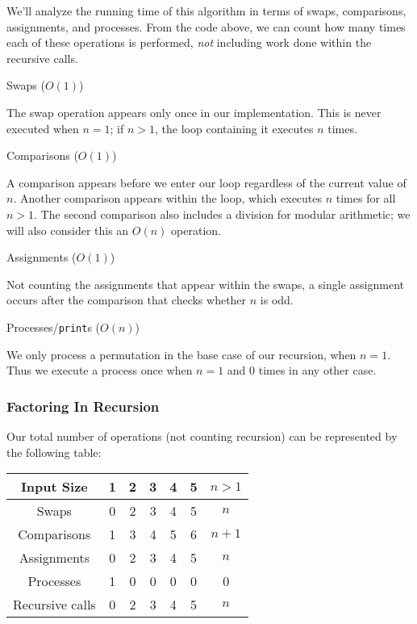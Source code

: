 \documentclass[10pt, oneside]{article}   	%
\begin{document}
We'll analyze the running time of this algorithm in terms of swaps, comparisons, assignments, and processes. From the code above, we can count how many times each of these operations is performed, \emph{not} including work done within the recursive calls.
\begin{description}
\item Swaps ($O(1)$)

	The swap operation appears only once in our implementation. This is never executed when $n=1$; if $n > 1$, the loop containing it executes $n$ times.

\item Comparisons ($O(1)$)

	A comparison appears before we enter our loop regardless of the current value of $n$. Another comparison appears within the loop, which executes $n$ times for all $n > 1$. The second comparison also includes a division for modular arithmetic; we will also consider this an $O(n)$ operation.

\item Assignments ($O(1)$)

	Not counting the assignments that appear within the swaps, a single assignment occurs after the comparison that checks whether $n$ is odd.

\item Processes/\texttt{print}s ($O(n)$)

	We only process a permutation in the base case of our recursion, when $n = 1$. Thus we execute a process once when $n = 1$ and 0 times in any other case.
\end{description}

\subsubsection{Factoring In Recursion}

Our total number of operations (not counting recursion) can be represented by the following table:

\begin{center}
\begin{tabular}{|c|c|c|c|c|c|c|}
	\hline
	Input Size & 1 & 2 & 3 & 4 & 5 & $n > 1$\\
	\hline
	Swaps & 0 & 2 & 3 & 4 & 5 & $n$\\
	\hline
	Comparisons & 1 & 3 & 4 & 5 & 6 & $n + 1$ \\
	\hline
	Assignments & 0 & 2 & 3 & 4 & 5 & $n$ \\
	\hline
	Processes & 1 & 0 & 0 & 0 & 0 & 0 \\
	\hline
	Recursive calls & 0 & 2 & 3 & 4 & 5 & $n$ \\
	\hline
\end{tabular}
\end{center}
\end{document}
